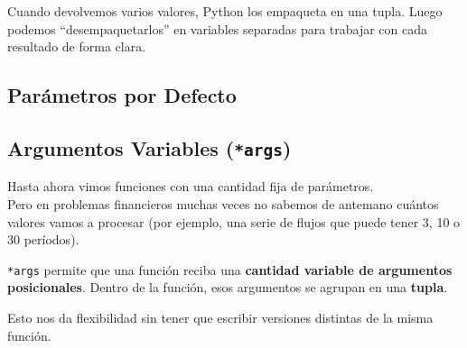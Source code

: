 \documentclass[
  spanish,
  letterpaper,
  DIV=11,
  numbers=noendperiod]{scrreprt}
\newenvironment{Shaded}{\begin{snugshade}}{\end{snugshade}}
\newcommand{\NormalTok}[1]{\textcolor[rgb]{0.00,0.23,0.31}{#1}}
\begin{document}
Cuando devolvemos varios valores, Python los empaqueta en una tupla.
Luego podemos ``desempaquetarlos'' en variables separadas para trabajar
con cada resultado de forma clara.

\subsection{Parámetros por Defecto}\label{paruxe1metros-por-defecto}

\begin{Shaded}
\end{Shaded}

\subsection{\texorpdfstring{Argumentos Variables
(\texttt{*args})}{Argumentos Variables (*args)}}\label{argumentos-variables-args}

Hasta ahora vimos funciones con una cantidad fija de parámetros.\\
Pero en problemas financieros muchas veces no sabemos de antemano
cuántos valores vamos a procesar (por ejemplo, una serie de flujos que
puede tener 3, 10 o 30 períodos).

\texttt{*args} permite que una función reciba una \textbf{cantidad
variable de argumentos posicionales}. Dentro de la función, esos
argumentos se agrupan en una \textbf{tupla}.

Esto nos da flexibilidad sin tener que escribir versiones distintas de
la misma función.
\end{document}
